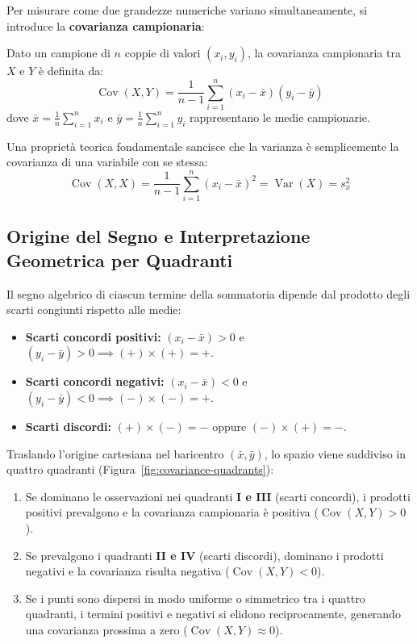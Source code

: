 Per misurare come due grandezze numeriche variano simultaneamente, si introduce la \textbf{covarianza campionaria}:

\begin{definition}
Dato un campione di $n$ coppie di valori $(x_i, y_i)$, la covarianza campionaria tra $X$ e $Y$ \`e definita da:
\begin{equation}
\operatorname{Cov}(X, Y) = \frac{1}{n-1} \sum_{i=1}^n (x_i - \bar{x})(y_i - \bar{y})
\end{equation}
dove $\bar{x} = \frac{1}{n}\sum_{i=1}^n x_i$ e $\bar{y} = \frac{1}{n}\sum_{i=1}^n y_i$ rappresentano le medie campionarie.
\end{definition}

Una propriet\`a teorica fondamentale sancisce che la varianza \`e semplicemente la covarianza di una variabile con se stessa:
\begin{equation}
\operatorname{Cov}(X, X) = \frac{1}{n-1} \sum_{i=1}^n (x_i - \bar{x})^2 = \operatorname{Var}(X) = s_x^2
\end{equation}

\subsection{Origine del Segno e Interpretazione Geometrica per Quadranti}
Il segno algebrico di ciascun termine della sommatoria dipende dal prodotto degli scarti congiunti rispetto alle medie:
\begin{itemize}
    \item \textbf{Scarti concordi positivi:} $(x_i - \bar{x}) > 0$ e $(y_i - \bar{y}) > 0 \implies (+)\times(+) = \mathbf{+}$.
    \item \textbf{Scarti concordi negativi:} $(x_i - \bar{x}) < 0$ e $(y_i - \bar{y}) < 0 \implies (-)\times(-) = \mathbf{+}$.
    \item \textbf{Scarti discordi:} $(+)\times(-) = \mathbf{-}$ oppure $(-)\times(+) = \mathbf{-}$.
\end{itemize}

Traslando l'origine cartesiana nel baricentro $(\bar{x}, \bar{y})$, lo spazio viene suddiviso in quattro quadranti (Figura~\ref{fig:covariance-quadrants}):
\begin{enumerate}
    \item Se dominano le osservazioni nei quadranti \textbf{I e III} (scarti concordi), i prodotti positivi prevalgono e la covarianza campionaria \`e positiva ($\operatorname{Cov}(X, Y) > 0$).
    \item Se prevalgono i quadranti \textbf{II e IV} (scarti discordi), dominano i prodotti negativi e la covarianza risulta negativa ($\operatorname{Cov}(X, Y) < 0$).
    \item Se i punti sono dispersi in modo uniforme o simmetrico tra i quattro quadranti, i termini positivi e negativi si elidono reciprocamente, generando una covarianza prossima a zero ($\operatorname{Cov}(X, Y) \approx 0$).
\end{enumerate}

